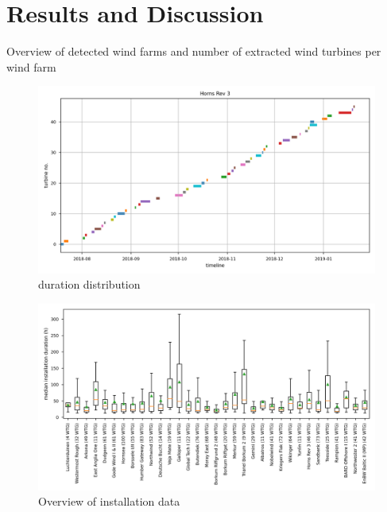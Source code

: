 \documentclass[wes, manuscript]{copernicus}
\begin{document}
\clearpage
\newpage

\section{Results and Discussion}

\begin{table}[ht]
    \caption[]{Overview of detected wind farms and number of extracted wind turbines per wind farm}
    \centering
    
    \label{tab:installations}
\end{table}

\clearpage
\newpage

\begin{figure}[h]
    \centering
    \includegraphics[width=\textwidth]{figures/gantt/Horns Rev 3.png}
    \caption{duration distribution}
    \label{fig:wind}
\end{figure}
\begin{figure}[h]
    \centering
    \includegraphics[width=\textwidth]{figures/installations-overview.png}
    \caption{Overview of installation data}
    \label{fig:overview}
\end{figure}
\end{document}
